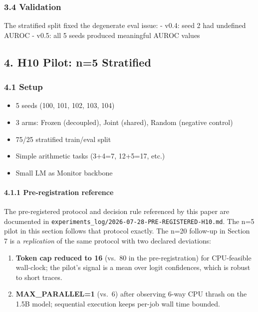 \documentclass[
]{article}
\providecommand{\tightlist}{%
  \setlength{\itemsep}{0pt}\setlength{\parskip}{0pt}}
\begin{document}
\subsubsection{3.4 Validation}\label{validation}

The stratified split fixed the degenerate eval issue: - v0.4: seed 2 had
undefined AUROC - v0.5: all 5 seeds produced meaningful AUROC values

\subsection{4. H10 Pilot: n=5 Stratified}\label{h10-pilot-n5-stratified}

\subsubsection{4.1 Setup}\label{setup}

\begin{itemize}
\tightlist
\item
  5 seeds (100, 101, 102, 103, 104)
\item
  3 arms: Frozen (decoupled), Joint (shared), Random (negative control)
\item
  75/25 stratified train/eval split
\item
  Simple arithmetic tasks (3+4=7, 12+5=17, etc.)
\item
  Small LM as Monitor backbone
\end{itemize}

\paragraph{4.1.1 Pre-registration
reference}\label{pre-registration-reference}

The pre-registered protocol and decision rule referenced by this paper
are documented in
\texttt{experiments\_log/2026-07-28-PRE-REGISTERED-H10.md}. The n=5
pilot in this section follows that protocol exactly. The n=20 follow-up
in Section 7 is a \emph{replication} of the same protocol with two
declared deviations:

\begin{enumerate}
\def\labelenumi{\arabic{enumi}.}
\tightlist
\item
  \textbf{Token cap reduced to 16} (vs.~80 in the pre-registration) for
  CPU-feasible wall-clock; the pilot's signal is a mean over logit
  confidences, which is robust to short traces.
\item
  \textbf{MAX\_PARALLEL=1} (vs.~6) after observing 6-way CPU thrash on
  the 1.5B model; sequential execution keeps per-job wall time bounded.
\end{enumerate}
\end{document}
